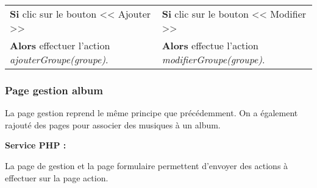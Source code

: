             \begin{center}
                \begin{tabular}{l | l}
                    \textbf{Si} clic sur le bouton << Ajouter >> & \textbf{Si} clic sur le bouton << Modifier >> \\
                    \textbf{Alors} effectuer l'action \emph{ajouterGroupe(groupe)}. & \textbf{Alors} effectue l'action \emph{modifierGroupe(groupe)}.
                \end{tabular}
            \end{center}
            
			
            
    \newpage

		\subsubsection{Page gestion album}

			\begin{paragraphe}
                La page gestion reprend le même principe que précédemment. On a également rajouté des pages pour associer des musiques à un album.
			\end{paragraphe}

			\begin{paragraphe}
				\textbf{Service PHP :}
			\end{paragraphe}
            
            \begin{paragraphe}
                La page de gestion et la page formulaire permettent d'envoyer des actions à effectuer sur la page action.
			\end{paragraphe}

